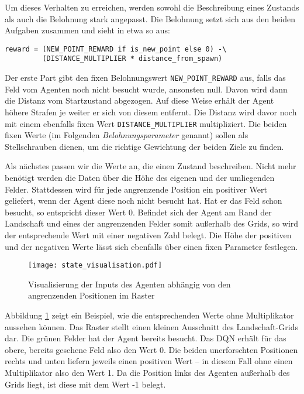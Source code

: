 Um dieses Verhalten zu erreichen, werden sowohl die Beschreibung eines Zustands als auch die Belohnung stark angepasst. Die Belohnung setzt sich aus den beiden Aufgaben zusammen und sieht in etwa so aus:
\begin{verbatim}
reward = (NEW_POINT_REWARD if is_new_point else 0) -\
         (DISTANCE_MULTIPLIER * distance_from_spawn)
\end{verbatim}
Der erste Part gibt den fixen Belohnungswert \texttt{NEW_POINT_REWARD} aus, falls das Feld vom Agenten noch nicht besucht wurde, ansonsten null. Davon wird dann die Distanz vom Startzustand abgezogen. Auf diese Weise erhält der Agent höhere Strafen je weiter er sich von diesem entfernt. Die Distanz wird davor noch mit einem ebenfalls fixen Wert \texttt{DISTANCE_MULTIPLIER} multipliziert. Die beiden fixen Werte (im Folgenden \textit{Belohnungsparameter} genannt) sollen als Stellschrauben dienen, um die richtige Gewichtung der beiden Ziele zu finden.

Als nächstes passen wir die Werte an, die einen Zustand beschreiben. Nicht mehr benötigt werden die Daten über die Höhe des eigenen und der umliegenden Felder. Stattdessen wird für jede angrenzende Position ein positiver Wert geliefert, wenn der Agent diese noch nicht besucht hat. Hat er das Feld schon besucht, so entspricht dieser Wert 0. Befindet sich der Agent am Rand der Landschaft und eines der angrenzenden Felder somit außerhalb des Grids, so wird der entsprechende Wert mit einer negativen Zahl belegt. Die Höhe der positiven und der negativen Werte lässt sich ebenfalls über einen fixen Parameter festlegen.
\begin{figure}[h!]
    \centering
    \texttt{[image: state\_visualisation.pdf]}
    \caption{Visualisierung der Inputs des Agenten abhängig von den angrenzenden Positionen im Raster} \label{img:stateVisualisation}
\end{figure}

Abbildung \ref{img:stateVisualisation} zeigt ein Beispiel, wie die entsprechenden Werte ohne Multiplikator aussehen können. Das Raster stellt einen kleinen Ausschnitt des Landschaft-Grids dar. Die grünen Felder hat der Agent bereits besucht. Das DQN erhält für das obere, bereits gesehene Feld also den Wert 0. Die beiden unerforschten Positionen rechts und unten liefern jeweils einen positiven Wert -- in diesem Fall ohne einen Multiplikator also den Wert 1. Da die Position links des Agenten außerhalb des Grids liegt, ist diese mit dem Wert -1 belegt.

